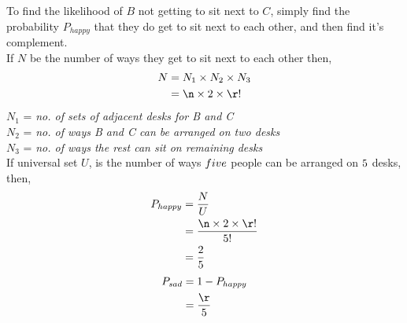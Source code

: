 \begin{solution}
  To find the likelihood of $B$ not getting to sit next to $C$, simply
  find the probability $P_{happy}$ that they do get to sit next to each 
  other, and then find it's complement.\\
  If $N$ be the number of ways they get to sit next to each other then, 
  \begin{align}
    N &= N_1\times N_2\times N_3 \\
      &= \n\times 2\times \r! 
  \end{align}
  $N_1$ = \textit{{no. of sets of adjacent desks for B and C}} \\
  $N_2$ = \textit{{no. of ways B and C can be arranged on two desks}} \\
  $N_3$ = \textit{{no. of ways the rest can sit on remaining desks}} \\
  
  If universal set $U$, is the number of ways $five$ people can be 
  arranged on $5$ desks, then,
  \begin{align}
    P_{happy} &= \dfrac{N}{U} \\
              &= \dfrac{\n\times 2\times \r!}{\vbfour!} \\
              &= \dfrac{2}{\vbfour}
  \end{align}
  \begin{align}
    P_{sad} &= 1 - P_{happy} \\
            &= \dfrac{\r}{\vbfour}
  \end{align}
  
\end{solution}

